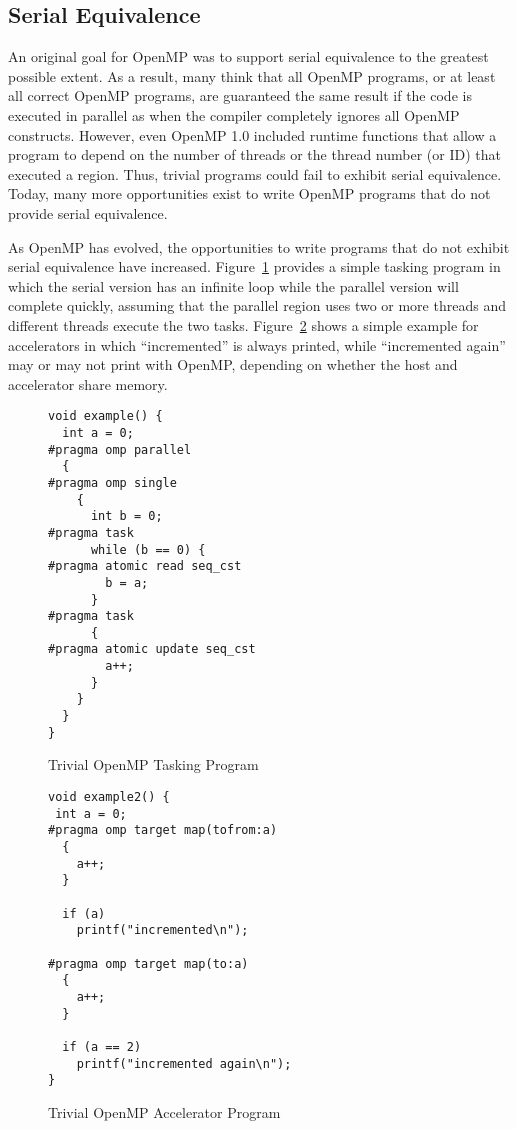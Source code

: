 \subsection{Serial Equivalence}
\label{sub:serial_equivalence}

An original goal for OpenMP was to support serial equivalence to the 
greatest possible extent. As a result, many think that all OpenMP programs, 
or at least all correct OpenMP programs, are guaranteed the same result
if the code is executed in parallel as when the compiler completely 
ignores all OpenMP constructs. However, even OpenMP 1.0 included runtime
functions that allow a program to depend on the number of threads or the
thread number (or ID) that executed a region. Thus, trivial programs could
fail to exhibit serial equivalence. Today, many more opportunities exist
to write OpenMP programs that do not provide serial equivalence. 

As OpenMP has evolved, the opportunities to write programs that do not
exhibit serial equivalence have increased. Figure~\ref{fig:trivial_task} 
provides a simple tasking program in which the serial version has an infinite 
loop while the parallel version will complete quickly, assuming that the 
parallel region uses two or more threads and different threads execute the 
two tasks. Figure~\ref{fig:trivial_target} shows a simple example for 
accelerators in which ``incremented'' is always printed, while 
``incremented again'' may or may not print with OpenMP, depending on 
whether the host and accelerator share memory. 

\begin{figure}
\begin{verbatim}
void example() {
  int a = 0;
#pragma omp parallel
  {
#pragma omp single
    {
      int b = 0;
#pragma task
      while (b == 0) {
#pragma atomic read seq_cst
        b = a;
      }
#pragma task
      {
#pragma atomic update seq_cst
        a++;
      }
    }
  }
}
\end{verbatim}
\caption{Trivial OpenMP Tasking Program\label{fig:trivial_task}}
\end{figure}

\begin{figure}
\begin{verbatim}
void example2() {
 int a = 0;
#pragma omp target map(tofrom:a)
  {
    a++;
  }

  if (a)
    printf("incremented\n");
  
#pragma omp target map(to:a)
  {
    a++;
  }

  if (a == 2)
    printf("incremented again\n");
}
\end{verbatim}
\caption{Trivial OpenMP Accelerator Program\label{fig:trivial_target}}
\end{figure}


